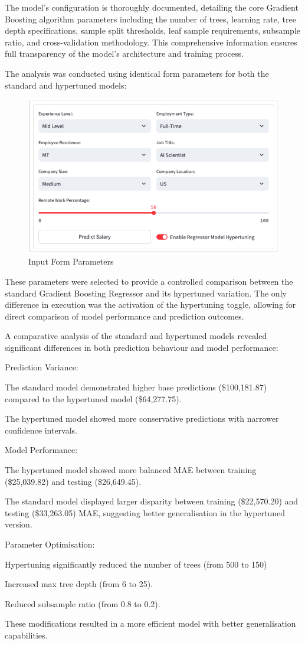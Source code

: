\documentclass[11pt,a4paper]{article}
\newcommand{\SubItem}[1]{
  {\setlength\itemindent{13pt} \item[◦] #1}
}
\begin{document}
The model's configuration is thoroughly documented, detailing the core Gradient Boosting algorithm parameters including the number of trees, learning rate, tree depth specifications, sample split thresholds, leaf sample requirements, subsample ratio, and cross-validation methodology. This comprehensive information ensures full transparency of the model's architecture and training process.

The analysis was conducted using identical form parameters for both the standard and hypertuned models:

\begin{figure}
    \centering
    \includegraphics[width=1\linewidth]{ICS-5110-DataInput.png}
    \caption{Input Form Parameters}
    \label{fig:Input Form Parameters}
\end{figure}

These parameters were selected to provide a controlled comparison between the standard Gradient Boosting Regressor and its hypertuned variation. The only difference in execution was the activation of the hypertuning toggle, allowing for direct comparison of model performance and prediction outcomes.

A comparative analysis of the standard and hypertuned models revealed significant differences in both prediction behaviour and model performance:
\begin{itemize}
\item Prediction Variance:
\SubItem{The standard model demonstrated higher base predictions (\$100,181.87) compared to the hypertuned model (\$64,277.75).}
\SubItem{The hypertuned model showed more conservative predictions with narrower confidence intervals.}
\item Model Performance:
\SubItem{The hypertuned model showed more balanced MAE between training (\$25,039.82) and testing (\$26,649.45).}
\SubItem{The standard model displayed larger disparity between training (\$22,570.20) and testing (\$33,263.05) MAE, suggesting better generalisation in the hypertuned version.}
\item Parameter Optimisation:
\SubItem{Hypertuning significantly reduced the number of trees (from 500 to 150)}
\SubItem{Increased max tree depth (from 6 to 25).}
\SubItem{Reduced subsample ratio (from 0.8 to 0.2).}
\end{itemize}
These modifications resulted in a more efficient model with better generalisation capabilities.
\end{document}
